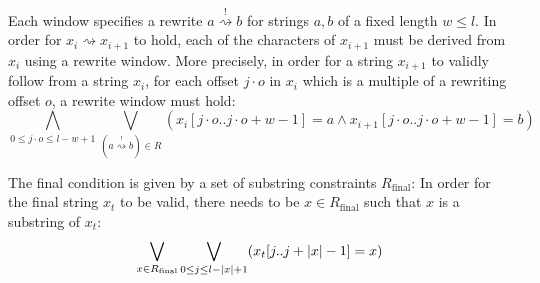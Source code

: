 \documentclass[a4paper,UKenglish,cleveref, autoref]{lipics-v2019}
\newcommand{\TODO}[1]{\ifthenelse{\isundefined{\showTODOs}}{}{\colorbox{red}{\LARGE TODO}:#1}}
\newcommand{\strent}{\rightsquigarrow}
\newcommand{\constrent}{\overset{!}{\rightsquigarrow}}
\newcommand{\Rfinal}{R_{\text{final}}}
\begin{document}
Each window specifies a rewrite $a \constrent b$ for strings $a, b$ of a fixed length $w \le l$. In order for $x_i \strent x_{i+1}$ to hold, each of the characters of $x_{i+1}$ must be derived from $x_i$ using a rewrite window.
More precisely, in order for a string $x_{i+1}$ to validly follow from a string $x_i$, for each offset $j \cdot o$ in $x_i$ which is a multiple of a rewriting offset $o$, a rewrite window must hold:
\[\bigwedge_{0 \le j\cdot o \le l - w + 1} \bigvee_{(a \constrent b) \in R} (x_i[j\cdot o..j\cdot o+w-1] = a \land x_{i+1}[j\cdot o..j\cdot o+w-1] = b) \]

The final condition is given by a set of substring constraints $\Rfinal$: In order for the final string $x_t$ to be valid, there needs to be $x \in \Rfinal$ such that $x$ is a substring of $x_t$:
\[\bigvee_{x \in \Rfinal} \bigvee_{0 \le j \le l - \length{x} + 1} (x_t[j..j+\length{x} -1] = x) \]

\newcommand*{\validR}{\textsf{valid}}



    
\end{document}
